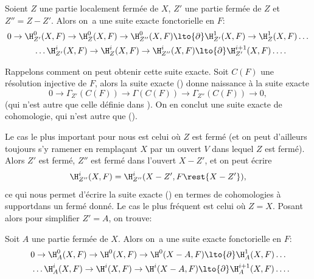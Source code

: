 \begin{theoreme} \label{I.2.8}
Soient $Z$ une partie localement ferm\'ee de $X$, $Z'$ une partie ferm\'ee de $Z$ et $Z''=Z-Z'$. Alors on~a une suite exacte fonctorielle en $F$:
\begin{equation} \label{eq:I.24}
\begin{gathered}
0 \to \H_{Z'}^0(X, F) \to \H_Z^0(X, F) \to \H_{Z''}^0(X, F)\lto{\partial} \H^1_{Z'}(X, F) \to \H^1_Z(X, F) \dots \\
\phantom{0}\dots \H_{Z'}^i(X, F) \to \H_Z^i(X, F) \to \H_{Z''}^i(X, F)\lto{\partial} \H^{i+1}_{Z'}(X, F)\dots.
\end{gathered}
\end{equation}
\end{theoreme}

Rappelons comment on peut obtenir cette suite exacte. Soit $C(F)$ une r\'esolution injective de $F$, alors la suite exacte () donne naissance \`a la suite exacte
\begin{equation} \label{eq:I.25} {0 \to \Gamma_{Z'}(C(F)) \to \Gamma(C(F)) \to \Gamma_{Z''}(C(F)) \to 0},
\end{equation}
(qui n'est autre que celle d\'efinie dans ). On en conclut une suite exacte de cohomologie, qui n'est autre que ().

Le cas le plus important pour nous est celui o\`u $Z$ est ferm\'e (et
on peut d'ailleurs toujours s'y ramener en rempla\c cant $X$ par
un ouvert $V$ dans lequel $Z$ est ferm\'e). Alors $Z'$ est ferm\'e,
$Z''$ est ferm\'e dans l'ouvert $X-Z'$, et on peut \'ecrire
\begin{equation} \label{eq:I.26} {\H^i_{Z''}(X, F)=\H^i_{Z''}(X-Z', F\rest{X-Z'})},
\end{equation}
ce qui nous permet d'\'ecrire la suite exacte () en termes de cohomologies \`a support\pageoriginale dans un ferm\'e donn\'e. Le cas le plus fr\'equent est celui o\`u $Z=X$. Posant alors pour simplifier $Z'=A$, on trouve:

\begin{corollaire} \label{I.2.9}
Soit $A$ une partie ferm\'ee de $X$. Alors on~a une suite exacte fonctorielle en $F$:
\begin{equation} \label{eq:I.27}
\begin{gathered}
0 \to \H^0_A(X, F) \to \H^0(X, F) \to \H^0(X-A, F) \lto{\partial} \H^1_A(X, F) \dots\\
\phantom{0}\dots \H^i_A(X, F) \to \H^i(X, F) \to \H^i(X-A, F) \lto{\partial} \H^{i+1}_A(X, F)\dots.
\end{gathered}
\end{equation}
\end{corollaire}

